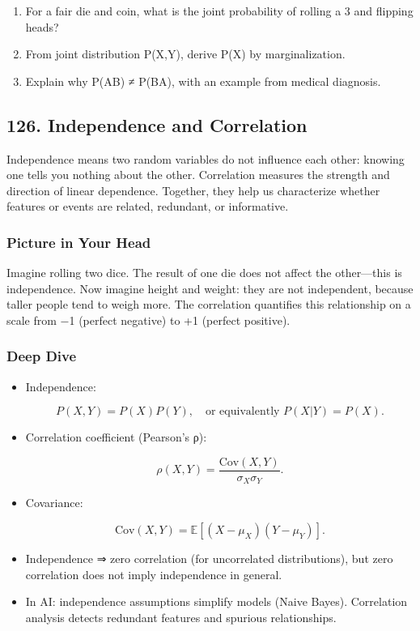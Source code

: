 \documentclass[
  letterpaper,
  DIV=11,
  numbers=noendperiod]{scrreprt}
\providecommand{\tightlist}{%
  \setlength{\itemsep}{0pt}\setlength{\parskip}{0pt}}
\begin{document}
\begin{enumerate}
\def\labelenumi{\arabic{enumi}.}
\tightlist
\item
  For a fair die and coin, what is the joint probability of rolling a 3
  and flipping heads?
\item
  From joint distribution P(X,Y), derive P(X) by marginalization.
\item
  Explain why P(A\textbar B) ≠ P(B\textbar A), with an example from
  medical diagnosis.
\end{enumerate}

\subsection{126. Independence and
Correlation}\label{independence-and-correlation}

Independence means two random variables do not influence each other:
knowing one tells you nothing about the other. Correlation measures the
strength and direction of linear dependence. Together, they help us
characterize whether features or events are related, redundant, or
informative.

\subsubsection{Picture in Your Head}\label{picture-in-your-head-125}

Imagine rolling two dice. The result of one die does not affect the
other---this is independence. Now imagine height and weight: they are
not independent, because taller people tend to weigh more. The
correlation quantifies this relationship on a scale from −1 (perfect
negative) to +1 (perfect positive).

\subsubsection{Deep Dive}\label{deep-dive-125}

\begin{itemize}
\item
  Independence:

  \[
  P(X,Y) = P(X)P(Y), \quad \text{or equivalently } P(X|Y)=P(X).
  \]
\item
  Correlation coefficient (Pearson's ρ):

  \[
  \rho(X,Y) = \frac{\text{Cov}(X,Y)}{\sigma_X \sigma_Y}.
  \]
\item
  Covariance:

  \[
  \text{Cov}(X,Y) = \mathbb{E}[(X-\mu_X)(Y-\mu_Y)].
  \]
\item
  Independence ⇒ zero correlation (for uncorrelated distributions), but
  zero correlation does not imply independence in general.
\item
  In AI: independence assumptions simplify models (Naive Bayes).
  Correlation analysis detects redundant features and spurious
  relationships.
\end{itemize}
\end{document}
